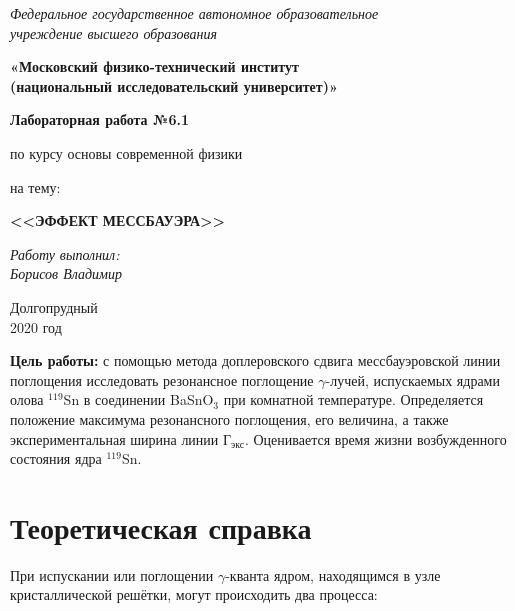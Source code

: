 \documentclass[a4paper, 12pt]{article}
\begin{document}
 
		\begin{titlepage}
			\begin{center}
				\textit{Федеральное государственное автономное образовательное\\ учреждение высшего образования }
				\vspace{0.5ex}
				
				\textbf{«Московский физико-технический институт\\ (национальный исследовательский университет)»}
			\end{center}
			\vspace{10ex}
			\begin{center}
				\vspace{13ex}
				\textbf{Лабораторная работа №6.1}
				\vspace{1ex}
				
				по курсу основы современной физики
				
				
				на тему:
				
				\textbf{\large{<<ЭФФЕКТ МЕССБАУЭРА>>}}
				
				\vspace{30ex}
				\begin{flushright}
					\noindent
					\textit{Работу выполнил:}
					\\
					\textit{Борисов Владимир
						 }
				\end{flushright}
				\vfill
				Долгопрудный \\2020 год
			\end{center}
		\end{titlepage}
	
				\newpage
		
	
	\pagestyle{fancy}
	
	\begin{spacing}{1}
\tableofcontents
\end{spacing}

\newpage

\textbf{Цель работы:} с помощью метода доплеровского сдвига мессбауэровской линии поглощения исследовать резонансное поглощение $\gamma$-лучей, испускаемых ядрами олова $^{119}$Sn в соединении BaSnO$_3$ при комнатной температуре. Определяется положение максимума резонансного поглощения, его величина, а также экспериментальная ширина линии Г$_\text{экс}$. Оценивается время жизни возбужденного состояния ядра $^{119}$Sn.

\section{Теоретическая справка}
При испускании или поглощении $\gamma$-кванта ядром, находящимся в узле кристаллической решётки, могут происходить два процесса:
\end{document}
